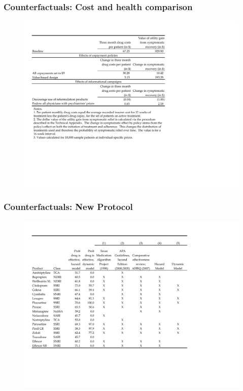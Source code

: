 \documentclass[xcolor=pdftex,dvipsnames,table,mathserif,aspectratio=169]{beamer}
\begin{document}

\begin{frame}[label=WELFARE]

\frametitle{Counterfactuals: Cost and health comparison}

\begin{figure}[h!]
\centering\includegraphics[width=1\linewidth]{./resources/welfare_table.pdf}
\end{figure}
\end{frame}


\begin{frame}[plain]

\frametitle{Counterfactuals: New Protocol}

\begin{figure}[h!]
\centering\includegraphics[width=1.\linewidth]{./resources/protocol.pdf}
\end{figure}
\end{frame}
\end{document}
